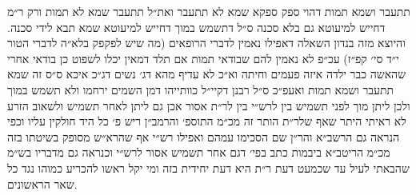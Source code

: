 \documentclass[12pt, openany]{book}
\begin{document}
\begin{multicols}{2}
תתעבר ושמא תמות דהוי ספק ספקא שמא לא תתעבר ואת״ל תתעבר שמא לא תמות ורק ר״מ דחייש למיעוטא גם בלא סכנה ס״ל דתשמש במוך דחייש למיעוטא שמא תבא לידי סכנה. והיוצא מזה בנדון השאלה דאפילו נאמין לדברי הרופאים (מה שיש לפקפק בלא״ה לדברי הטור י״ד סי׳ קפ״ז) עכ״פ לא נאמין להם שבודאי תמות אם תלד דמאין יכלו לשפוט כן בודאי אחרי שהאשה כבר ילדה איזה פעמים וחיתה וא״כ לא עדיף מהא דג׳ נשים דג״כ איכא ס״ס זה שמא תתעבר ושמא תמות ואעפ״כ ס״ל רבנן דקיי״ל כוותייהו דמן השמים ירחמו ולא תשמש במוך ולכן ליתן מוך לפני תשמיש בין לרש״י בין לר״ת אסור אכן גם ליתן לאחר תשמיש ולשאוב הזרע לא ראיתי היתר שאף שלר״ת הותר זה מכ״מ התוספ׳ והרמב״ן ריש פ׳ כל היד חולקין עליו וכפי הנראה גם הרשב״א והר״ן שם הסכימו עמהם ואפילו רש״י אף שהרא״ש מסופק בשיטתו בזה מכ״מ הריטב״א ביבמות כתב בפי׳ דגם אחר תשמיש אסור לרש״י וכנראה גם מדבריו בש״מ שהבאתי לעיל עד שכמעט דעת ר״ת היא דעת יחידית בזה ומי יקל ראשו להכריע כמוהו נגד כל שאר הראשונים.\\\vspace{0pt}


\end{multicols}
\end{document}
